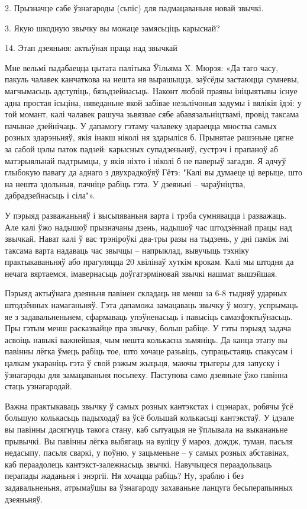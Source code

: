 2. Прызначце сабе ўзнагароды (сьпіс) для падмацаваньня новай звычкі.

3. Якую шкодную звычку вы можаце замясьціць карыснай?


14. Этап дзеяньня: актыўная праца над звычкай

Мне вельмі падабаецца цытата палітыка Ўільяма X. Мюрэя: «Да таго часу, пакуль чалавек канчаткова на нешта ня вырашыцца, заўсёды застаюцца сумневы, магчымасьць адступіць, бязьдзейнасьць. Наконт любой праявы ініцыятывы існуе адна простая ісьціна, няведаньне якой забівае незьлічоныя задумы і вялікія ідэі: у той момант, калі чалавек рашуча зьвязвае сябе абавязальніцтвамі, провід таксама пачынае дзейнічаць. У дапамогу гэтаму чалавеку здараецца мноства самых розных здарэньняў, якія інакш ніколі ня здарыліся б. Прынятае рашэньне цягне за сабой цэлы паток падзей: карысных супадзеньняў, сустрэч і прапаноў аб матэрыяльнай падтрымцы, у якія ніхто і ніколі б не паверыў загадзя. Я адчуў глыбокую павагу да аднаго з двухрадкоўяў Гётэ: "Калі вы думаеце ці верыце, што на нешта здольныя, пачніце рабіць гэта. У дзеяньні – чараўніцтва, дабрадзейнасьць і сіла"».

У пэрыяд разважаньняў і высьпяваньня варта і трэба сумнявацца і разважаць. Але калі ўжо надышоў прызначаны дзень, надышоў час штодзённай працы над звычкай. Нават калі ў вас трэніроўкі два-тры разы на тыдзень, у дні паміж імі таксама варта надаваць час звычцы – напрыклад, вывучыць тэхніку практыкаваньняў або прагуляцца 20 хвілінаў хуткім крокам. Калі мы штодня да нечага вяртаемся, імавернасьць доўгатэрміновай звычкі нашмат вышэйшая.

Пэрыяд актыўнага дзеяньня павінен складаць ня менш за 6-8 тыдняў ударных штодзённых намаганьняў. Гэта дапаможа замацаваць звычку ў мозгу, успрымаць яе з задавальненьнем, сфармаваць упэўненасьць і павысіць самаэфэктыўнасьць. Пры гэтым менш расказвайце пра звычку, больш рабіце. У гэты пэрыяд задача асвоіць навыкі важнейшая, чым нешта колькасна зьмяніць. Да канца этапу вы павінны лёгка ўмець рабіць тое, што хочаце разьвіць, супрацьстаяць спакусам і цалкам укараніць гэта ў свой рэжым жыцьця, маючы трыгеры для запуску і ўзнагароды для замацаваньня посьпеху. Паступова само дзеяньне ўжо павінна стаць узнагародай.

Важна практыкаваць звычку ў самых розных кантэкстах і сцэнарах, робячы ўсё большую колькасьць падыходаў ва ўсё большай колькасьці кантэкстаў. У ідэале вы павінны дасягнуць такога стану, каб сытуацыя не ўплывала на выкананьне прывычкі. Вы павінны лёгка выбягаць на вуліцу ў мароз, дождж, туман, пасьля недасыпу, пасьля сваркі, у поўню, у зацьменьне – у самых розных абставінах, каб пераадолець кантэкст-залежнасьць звычкі. Навучыцеся пераадольваць перапады жаданьня і энэргіі. Ня хочацца рабіць? Ну, зраблю і без задавальненьня, атрымаўшы ва ўзнагароду захаваньне ланцуга бесьперапынных дзеяньняў.


